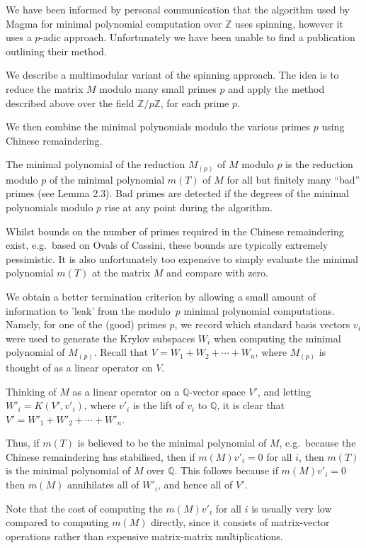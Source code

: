 \documentclass{sig-alternate-05-2015}
\begin{document}
We have been informed by personal communication that the algorithm used by
Magma \cite{magma} for minimal polynomial computation over $\mathbb{Z}$ uses
spinning, however it uses a $p$-adic approach. Unfortunately
we have been unable to find a publication outlining their method.

We describe a multimodular variant of the spinning approach. The idea is to
reduce the matrix $M$ modulo many small primes $p$ and apply the method
described above over the field $\mathbb{Z}/p\mathbb{Z}$, for each prime $p$.

We then combine the minimal polynomials modulo the various primes $p$ using
Chinese remaindering.

The minimal polynomial of the reduction $M_{(p)}$ of $M$ modulo $p$ is the
reduction modulo $p$ of the minimal polynomial $m(T)$ of $M$ for all but
finitely many ``bad'' primes (see \cite{giesbrecht} Lemma 2.3). Bad primes
are detected if the degrees of the minimal polynomials modulo $p$ rise at
any point during the algorithm.

Whilst bounds on the number of primes required in the Chinese remaindering
exist, e.g.\ based on Ovals of Cassini, these bounds are typically extremely
pessimistic. It is also unfortunately too expensive to simply evaluate the
minimal polynomial $m(T)$ at the matrix $M$ and compare with zero.

We obtain a better termination criterion by allowing a small amount of
information to 'leak' from the modulo~$p$ minimal polynomial computations.
Namely, for one of the (good) primes $p$, we record which standard
basis vectors $v_i$ were used to generate the Krylov subspaces $W_i$ when
computing the minimal polynomial of $M_{(p)}$. Recall that
$V = W_1 + W_2 + \cdots + W_n$, where $M_{(p)}$ is thought of as a linear
operator on $V$.

Thinking of $M$ as a linear operator on a $\mathbb{Q}$-vector space $V'$,
and letting $W'_i = K(V', v'_i)$, where $v'_i$ is the lift of $v_i$ to
$\mathbb{Q}$, it is clear that $V' = W'_1 + W'_2 + \cdots + W'_n$.

Thus, if $m(T)$ is believed to be the minimal polynomial of $M$,
e.g.\ because the Chinese remaindering has stabilised, then if $m(M)v'_i = 0$
for all $i$, then $m(T)$ is the minimal polynomial of $M$ over $\mathbb{Q}$.
This follows because if $m(M)v'_i = 0$ then $m(M)$ annihilates all of $W'_i$,
and hence all of $V'$.

Note that the cost of computing the $m(M)v'_i$ for all $i$ is usually very low
compared to computing $m(M)$ directly, since it consists of matrix-vector
operations rather than expensive matrix-matrix multiplications.
\end{document}
